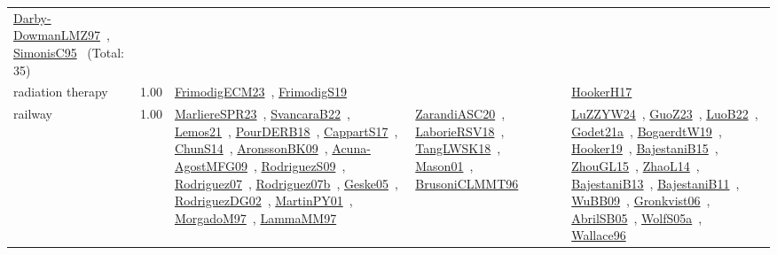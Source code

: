 {\begin{longtable}{p{3cm}r>{\raggedright\arraybackslash}p{6cm}>{\raggedright\arraybackslash}p{6cm}>{\raggedright\arraybackslash}p{8cm}}
\href{../works/Darby-DowmanLMZ97.pdf}{Darby-DowmanLMZ97}~\cite{Darby-DowmanLMZ97}, \href{../works/SimonisC95.pdf}{SimonisC95}~\cite{SimonisC95} (Total: 35)\\
\index{radiation therapy}\index{ApplicationAreas!radiation therapy}radiation therapy &  1.00 & \href{../works/FrimodigECM23.pdf}{FrimodigECM23}~\cite{FrimodigECM23}, \href{../works/FrimodigS19.pdf}{FrimodigS19}~\cite{FrimodigS19} &  & \href{../works/HookerH17.pdf}{HookerH17}~\cite{HookerH17}\\
\index{railway}\index{ApplicationAreas!railway}railway &  1.00 & \href{../works/MarliereSPR23.pdf}{MarliereSPR23}~\cite{MarliereSPR23}, \href{../works/SvancaraB22.pdf}{SvancaraB22}~\cite{SvancaraB22}, \href{../works/Lemos21.pdf}{Lemos21}~\cite{Lemos21}, \href{../works/PourDERB18.pdf}{PourDERB18}~\cite{PourDERB18}, \href{../works/CappartS17.pdf}{CappartS17}~\cite{CappartS17}, \href{../works/ChunS14.pdf}{ChunS14}~\cite{ChunS14}, \href{../works/AronssonBK09.pdf}{AronssonBK09}~\cite{AronssonBK09}, \href{../works/Acuna-AgostMFG09.pdf}{Acuna-AgostMFG09}~\cite{Acuna-AgostMFG09}, \href{../works/RodriguezS09.pdf}{RodriguezS09}~\cite{RodriguezS09}, \href{../works/Rodriguez07.pdf}{Rodriguez07}~\cite{Rodriguez07}, \href{../works/Rodriguez07b.pdf}{Rodriguez07b}~\cite{Rodriguez07b}, \href{../works/Geske05.pdf}{Geske05}~\cite{Geske05}, \href{../works/RodriguezDG02.pdf}{RodriguezDG02}~\cite{RodriguezDG02}, \href{../works/MartinPY01.pdf}{MartinPY01}~\cite{MartinPY01}, \href{../works/MorgadoM97.pdf}{MorgadoM97}~\cite{MorgadoM97}, \href{../works/LammaMM97.pdf}{LammaMM97}~\cite{LammaMM97} & \href{../works/ZarandiASC20.pdf}{ZarandiASC20}~\cite{ZarandiASC20}, \href{../works/LaborieRSV18.pdf}{LaborieRSV18}~\cite{LaborieRSV18}, \href{../works/TangLWSK18.pdf}{TangLWSK18}~\cite{TangLWSK18}, \href{../works/Mason01.pdf}{Mason01}~\cite{Mason01}, \href{../works/BrusoniCLMMT96.pdf}{BrusoniCLMMT96}~\cite{BrusoniCLMMT96} & \href{../works/LuZZYW24.pdf}{LuZZYW24}~\cite{LuZZYW24}, \href{../works/GuoZ23.pdf}{GuoZ23}~\cite{GuoZ23}, \href{../works/LuoB22.pdf}{LuoB22}~\cite{LuoB22}, \href{../works/Godet21a.pdf}{Godet21a}~\cite{Godet21a}, \href{../works/BogaerdtW19.pdf}{BogaerdtW19}~\cite{BogaerdtW19}, \href{../works/Hooker19.pdf}{Hooker19}~\cite{Hooker19}, \href{../works/BajestaniB15.pdf}{BajestaniB15}~\cite{BajestaniB15}, \href{../works/ZhouGL15.pdf}{ZhouGL15}~\cite{ZhouGL15}, \href{../works/ZhaoL14.pdf}{ZhaoL14}~\cite{ZhaoL14}, \href{../works/BajestaniB13.pdf}{BajestaniB13}~\cite{BajestaniB13}, \href{../works/BajestaniB11.pdf}{BajestaniB11}~\cite{BajestaniB11}, \href{../works/WuBB09.pdf}{WuBB09}~\cite{WuBB09}, \href{../works/Gronkvist06.pdf}{Gronkvist06}~\cite{Gronkvist06}, \href{../works/AbrilSB05.pdf}{AbrilSB05}~\cite{AbrilSB05}, \href{../works/WolfS05a.pdf}{WolfS05a}~\cite{WolfS05a}, \href{../works/Wallace96.pdf}{Wallace96}~\cite{Wallace96}\\

\end{longtable}}

